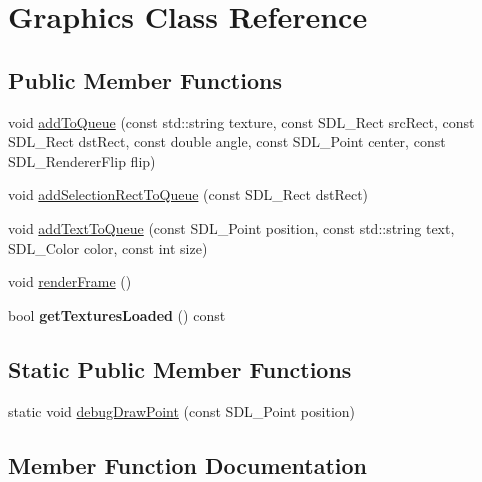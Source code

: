 \hypertarget{class_graphics}{}\section{Graphics Class Reference}
\label{class_graphics}
\subsection*{Public Member Functions}
\begin{DoxyCompactItemize}
\item 
void \hyperlink{class_graphics_a18057ca5d767018b52783da0f3cd79b0}{add\+To\+Queue} (const std\+::string texture, const S\+D\+L\+\_\+\+Rect src\+Rect, const S\+D\+L\+\_\+\+Rect dst\+Rect, const double angle, const S\+D\+L\+\_\+\+Point center, const S\+D\+L\+\_\+\+Renderer\+Flip flip)
\item 
void \hyperlink{class_graphics_a5400b6cca6b12641fc1c3437a188c170}{add\+Selection\+Rect\+To\+Queue} (const S\+D\+L\+\_\+\+Rect dst\+Rect)
\item 
void \hyperlink{class_graphics_aea25e7b064572a86896cc952037e2c1d}{add\+Text\+To\+Queue} (const S\+D\+L\+\_\+\+Point position, const std\+::string text, S\+D\+L\+\_\+\+Color color, const int size)
\item 
void \hyperlink{class_graphics_a53721226d05dcf492faae8c222a744e0}{render\+Frame} ()
\item 
\mbox{\label{class_graphics_a6124f0ca5971de8671a0b74fb49d0b52}} 
bool {\bfseries get\+Textures\+Loaded} () const
\end{DoxyCompactItemize}
\subsection*{Static Public Member Functions}
\begin{DoxyCompactItemize}
\item 
static void \hyperlink{class_graphics_ae33ea92e808a6e760032272b5d37ffcb}{debug\+Draw\+Point} (const S\+D\+L\+\_\+\+Point position)
\end{DoxyCompactItemize}


\subsection{Member Function Documentation}
\mbox{\label{class_graphics_a5400b6cca6b12641fc1c3437a188c170}} 
